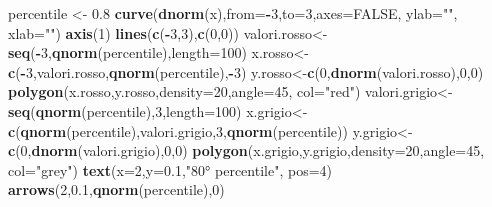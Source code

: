 \documentclass[a4paper,12pt,oneside]{book}
\newenvironment{Shaded}{\begin{snugshade}}{\end{snugshade}}
\newcommand{\KeywordTok}[1]{\textcolor[rgb]{0.13,0.29,0.53}{\textbf{#1}}}
\newcommand{\DataTypeTok}[1]{\textcolor[rgb]{0.13,0.29,0.53}{#1}}
\newcommand{\DecValTok}[1]{\textcolor[rgb]{0.00,0.00,0.81}{#1}}
\newcommand{\FloatTok}[1]{\textcolor[rgb]{0.00,0.00,0.81}{#1}}
\newcommand{\StringTok}[1]{\textcolor[rgb]{0.31,0.60,0.02}{#1}}
\newcommand{\OtherTok}[1]{\textcolor[rgb]{0.56,0.35,0.01}{#1}}
\newcommand{\OperatorTok}[1]{\textcolor[rgb]{0.81,0.36,0.00}{\textbf{#1}}}
\newcommand{\NormalTok}[1]{#1}
\theoremstyle{definition}
\theoremstyle{definition}
\theoremstyle{definition}
\theoremstyle{remark}
\begin{document}
\begin{Shaded}
\begin{Highlighting}[]
\NormalTok{percentile <-}\StringTok{ }\FloatTok{0.8}
\KeywordTok{curve}\NormalTok{(}\KeywordTok{dnorm}\NormalTok{(x),}\DataTypeTok{from=}\OperatorTok{-}\DecValTok{3}\NormalTok{,}\DataTypeTok{to=}\DecValTok{3}\NormalTok{,}\DataTypeTok{axes=}\OtherTok{FALSE}\NormalTok{, }\DataTypeTok{ylab=}\StringTok{""}\NormalTok{, }\DataTypeTok{xlab=}\StringTok{""}\NormalTok{)}
\KeywordTok{axis}\NormalTok{(}\DecValTok{1}\NormalTok{)}
\KeywordTok{lines}\NormalTok{(}\KeywordTok{c}\NormalTok{(}\OperatorTok{-}\DecValTok{3}\NormalTok{,}\DecValTok{3}\NormalTok{),}\KeywordTok{c}\NormalTok{(}\DecValTok{0}\NormalTok{,}\DecValTok{0}\NormalTok{))}
\NormalTok{valori.rosso<-}\KeywordTok{seq}\NormalTok{(}\OperatorTok{-}\DecValTok{3}\NormalTok{,}\KeywordTok{qnorm}\NormalTok{(percentile),}\DataTypeTok{length=}\DecValTok{100}\NormalTok{)}
\NormalTok{x.rosso<-}\KeywordTok{c}\NormalTok{(}\OperatorTok{-}\DecValTok{3}\NormalTok{,valori.rosso,}\KeywordTok{qnorm}\NormalTok{(percentile),}\OperatorTok{-}\DecValTok{3}\NormalTok{)}
\NormalTok{y.rosso<-}\KeywordTok{c}\NormalTok{(}\DecValTok{0}\NormalTok{,}\KeywordTok{dnorm}\NormalTok{(valori.rosso),}\DecValTok{0}\NormalTok{,}\DecValTok{0}\NormalTok{)}
\KeywordTok{polygon}\NormalTok{(x.rosso,y.rosso,}\DataTypeTok{density=}\DecValTok{20}\NormalTok{,}\DataTypeTok{angle=}\DecValTok{45}\NormalTok{, }\DataTypeTok{col=}\StringTok{"red"}\NormalTok{)}
\NormalTok{valori.grigio<-}\KeywordTok{seq}\NormalTok{(}\KeywordTok{qnorm}\NormalTok{(percentile),}\DecValTok{3}\NormalTok{,}\DataTypeTok{length=}\DecValTok{100}\NormalTok{)}
\NormalTok{x.grigio<-}\KeywordTok{c}\NormalTok{(}\KeywordTok{qnorm}\NormalTok{(percentile),valori.grigio,}\DecValTok{3}\NormalTok{,}\KeywordTok{qnorm}\NormalTok{(percentile))}
\NormalTok{y.grigio<-}\KeywordTok{c}\NormalTok{(}\DecValTok{0}\NormalTok{,}\KeywordTok{dnorm}\NormalTok{(valori.grigio),}\DecValTok{0}\NormalTok{,}\DecValTok{0}\NormalTok{)}
\KeywordTok{polygon}\NormalTok{(x.grigio,y.grigio,}\DataTypeTok{density=}\DecValTok{20}\NormalTok{,}\DataTypeTok{angle=}\DecValTok{45}\NormalTok{, }\DataTypeTok{col=}\StringTok{"grey"}\NormalTok{)}
\KeywordTok{text}\NormalTok{(}\DataTypeTok{x=}\DecValTok{2}\NormalTok{,}\DataTypeTok{y=}\FloatTok{0.1}\NormalTok{,}\StringTok{"80° percentile"}\NormalTok{, }\DataTypeTok{pos=}\DecValTok{4}\NormalTok{)}
\KeywordTok{arrows}\NormalTok{(}\DecValTok{2}\NormalTok{,}\FloatTok{0.1}\NormalTok{,}\KeywordTok{qnorm}\NormalTok{(percentile),}\DecValTok{0}\NormalTok{)}
\end{Highlighting}
\end{Shaded}
\end{document}
